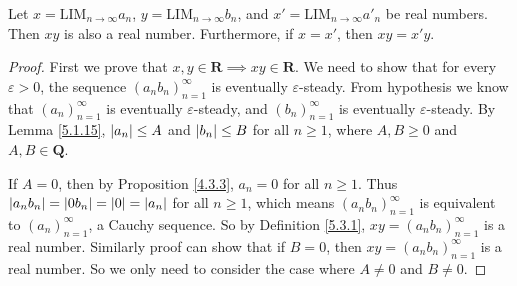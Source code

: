 \begin{proposition}\label{5.3.10}
    Let \(x = \text{LIM}_{n \to \infty} a_n\), \(y = \text{LIM}_{n \to \infty} b_n\), and \(x' = \text{LIM}_{n \to \infty} a'_n\) be real numbers.
    Then \(xy\) is also a real number.
    Furthermore, if \(x = x'\), then \(xy = x'y\).
\end{proposition}

\begin{proof}
    First we prove that \(x, y \in \mathbf{R} \implies xy \in \mathbf{R}\).
    We need to show that for every \(\varepsilon > 0\), the sequence \((a_n b_n)_{n = 1}^{\infty}\) is eventually \(\varepsilon\)-steady.
    From hypothesis we know that \((a_n)_{n = 1}^{\infty}\) is eventually \(\varepsilon\)-steady, and \((b_n)_{n = 1}^{\infty}\) is eventually \(\varepsilon\)-steady.
    By Lemma \ref{5.1.15}, \(\abs*{a_n} \leq A\) and \(\abs*{b_n} \leq B\) for all \(n \geq 1\), where \(A, B \geq 0\) and \(A, B \in \mathbf{Q}\).

    If \(A = 0\), then by Proposition \ref{4.3.3}, \(a_n = 0\) for all \(n \geq 1\).
    Thus \(\abs*{a_n b_n} = \abs*{0b_n} = \abs*{0} = \abs*{a_n}\) for all \(n \geq 1\), which means \((a_n b_n)_{n = 1}^{\infty}\) is equivalent to \((a_n)_{n = 1}^{\infty}\), a Cauchy sequence.
    So by Definition \ref{5.3.1}, \(xy = (a_n b_n)_{n = 1}^{\infty}\) is a real number.
    Similarly proof can show that if \(B = 0\), then \(xy = (a_n b_n)_{n = 1}^{\infty}\) is a real number.
    So we only need to consider the case where \(A \neq 0\) and \(B \neq 0\).


\end{proof}
